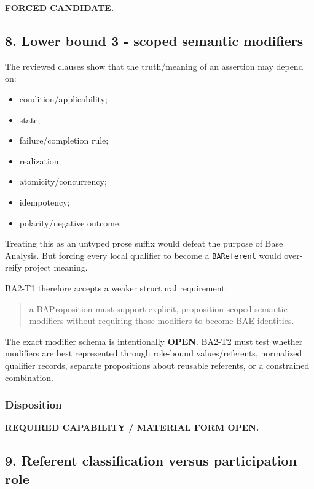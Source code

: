 \documentclass[
  10pt,
  letterpaper,
]{article}
\providecommand{\tightlist}{%
  \setlength{\itemsep}{0pt}\setlength{\parskip}{0pt}}
\begin{document}
\textbf{FORCED CANDIDATE.}

\subsection{8. Lower bound 3 - scoped semantic
modifiers}\label{lower-bound-3---scoped-semantic-modifiers}

The reviewed clauses show that the truth/meaning of an assertion may
depend on:

\begin{itemize}
\tightlist
\item
  condition/applicability;
\item
  state;
\item
  failure/completion rule;
\item
  realization;
\item
  atomicity/concurrency;
\item
  idempotency;
\item
  polarity/negative outcome.
\end{itemize}

Treating this as an untyped prose suffix would defeat the purpose of
Base Analysis. But forcing every local qualifier to become a
\texttt{BAReferent} would over-reify project meaning.

BA2-T1 therefore accepts a weaker structural requirement:

\begin{quote}
a BAProposition must support explicit, proposition-scoped semantic
modifiers without requiring those modifiers to become BAE identities.
\end{quote}

The exact modifier schema is intentionally \textbf{OPEN}. BA2-T2 must
test whether modifiers are best represented through role-bound
values/referents, normalized qualifier records, separate propositions
about reusable referents, or a constrained combination.

\subsubsection{Disposition}\label{disposition-4}

\textbf{REQUIRED CAPABILITY / MATERIAL FORM OPEN.}

\subsection{9. Referent classification versus participation
role}\label{referent-classification-versus-participation-role}
\end{document}
